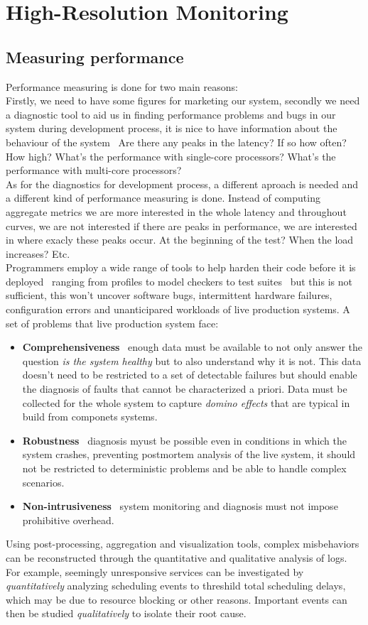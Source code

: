 \chapter{High-Resolution Monitoring}
\section{Measuring performance}
Performance measuring is done for two main reasons:\\
Firstly, we need to have some figures for marketing our system, secondly we need a diagnostic tool to aid us in finding performance
problems and bugs in our system during development process, it is nice to have information about the behaviour of the system \textendash\ 
Are there any peaks in the latency? If so how often? How high? What's the performance with single-core processors? What's the performance
with multi-core processors? \\[0.3cm]
As for the diagnostics for development process, a different aproach is needed and a different kind of performance measuring is done.
Instead of computing aggregate metrics we are more interested in the whole latency and throughout curves, we are not interested if there are 
peaks in performance, we are interested in where exacly these peaks occur. At the beginning of the test? When the load increases? Etc.\\[0.3cm]
Programmers employ a wide range of tools to help harden their code before it is deployed \textendash\ ranging from profiles to model checkers 
to test suites \textendash\ but this is not sufficient, this won't uncover software bugs, intermittent hardware failures, configuration errors
and unanticipared workloads of live production systems.
\clearpage
A set of problems that live production system face:
\begin{itemize}
  \item {\bf Comprehensiveness} \textendash\ enough data must be available to not only answer the question \emph{is the system healthy} but
  to also understand why it is not. This data doesn't need to be restricted to a set of detectable failures but should enable the diagnosis of 
  faults that cannot be characterized a priori. Data must be collected for the whole system to capture \emph{domino effects} that are typical 
  in build from componets systems.
  \item {\bf Robustness} \textendash\ diagnosis myust be possible even in conditions in which the system crashes, preventing postmortem 
  analysis of the live system, it should not be restricted to deterministic problems and be able to handle complex scenarios.
  \item {\bf Non-intrusiveness} \textendash\ system monitoring and diagnosis must not impose prohibitive overhead.
\end{itemize}
Using post-processing, aggregation and visualization tools, complex misbehaviors can be reconstructed through the quantitative and 
qualitative analysis of logs. For example, seemingly unresponsive services can be investigated by \emph{quantitatively} analyzing 
scheduling events to threshild total scheduling delays, which may be due to resource blocking or other reasons. Important events can then 
be studied  \emph{qualitatively} to isolate their root cause.
